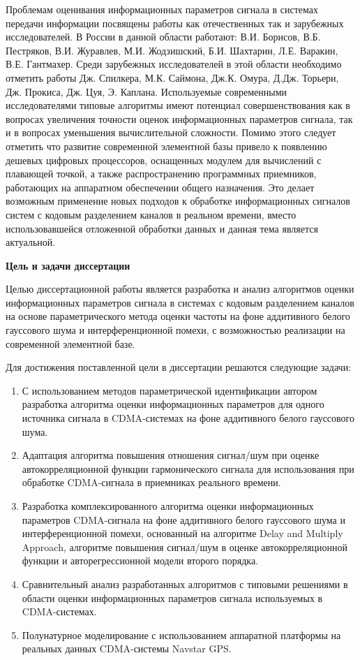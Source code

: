Проблемам оценивания информационных параметров сигнала в системах передачи информации посвящены работы как отечественных так и зарубежных исследователей.
В России в данной области работают: В.И. Борисов, В.Б. Пестряков, В.И. Журавлев, М.И. Жодзишский,
Б.И. Шахтарин, Л.Е. Варакин, В.Е. Гантмахер.
Среди зарубежных исследователей в этой области необходимо отметить работы Дж. Спилкера, М.К. Саймона, Дж.К. Омура, Д.Дж. Торьери, Дж. Прокиса, Дж. Цуя, Э. Каплана.
Используемые современными исследователями типовые алгоритмы имеют потенциал совершенствования как в вопросах увеличения точности оценок
информационных параметров сигнала, так и в вопросах уменьшения вычислительной сложности.
Помимо этого следует отметить что развитие современной элементной базы привело к появлению дешевых цифровых процессоров, оснащенных модулем для вычислений
с плавающей точкой, а также распространению программных приемников, работающих на аппаратном обеспечении общего назначения. Это делает возможным применение новых
подходов к обработке информационных сигналов систем с кодовым разделением каналов в реальном времени, вместо использовавшейся отложенной обработки данных и данная
тема является актуальной.

{\bf{Цель и задачи диссертации}}

Целью диссертационной работы является разработка и анализ алгоритмов оценки информационных параметров сигнала в системах с кодовым разделением каналов на основе
параметрического метода оценки частоты на фоне аддитивного белого гауссового шума и интерференционной помехи,
с возможностью реализации на современной элементной базе.

Для достижения поставленной цели в диссертации решаются следующие задачи:
\begin{enumerate}
	\item {С использованием методов параметрической идентификации автором разработка алгоритма оценки информационных параметров для одного источника сигнала
		в CDMA-системах на фоне аддитивного белого гауссового шума.}
	\item {Адаптация алгоритма повышения отношения сигнал/шум при оценке автокорреляционной функции гармонического сигнала для использования при обработке
		CDMA-сигнала в приемниках реального времени.}
	\item {Разработка комплексированного алгоритма оценки информационных параметров CDMA-сигнала на фоне аддитивного белого гауссового шума и
		интерференционной помехи, основанный на алгоритме Delay and Multiply Approach, алгоритме повышения сигнал/шум в оценке автокорреляционной функции 
		и авторегрессионной модели второго порядка.}
	\item {Сравнительный анализ разработанных алгоритмов с типовыми решениями в области оценки информационных параметров сигнала используемых в CDMA-системах.}
	\item {Полунатурное моделирование с использованием аппаратной платформы на реальных данных CDMA-системы Navstar GPS.}
\end{enumerate}

